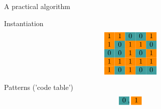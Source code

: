 \documentclass[11pt]{beamer}
\begin{document}

\begin{frame}{A practical algorithm}

\newcommand{\ca}{\cellcolor{cyan!45!yellow}}
\newcommand{\cb}{\cellcolor{red!75!blue}}
\newcommand{\cc}{\cellcolor{violet}}
\newcommand{\cd}{\cellcolor{teal!75}}
\newcommand{\ce}{\cellcolor{red!45!yellow}}

Instantiation
$$
\begin{matrix}
\ce 1 & \ce 1 & \cd 0 & \cd 0 & \ce 1  \\
\ce 1 & \cd 0 & \ce 1 & \ce 1 & \cd 0  \\
\cd 0 & \cd 0 & \ce 1 & \cd 0 & \ce 1  \\
\ce 1 & \ce 1 & \ce 1 & \ce 1 & \ce 1  \\
\ce 1 & \cd 0 & \ce 1 & \cd 0 & \cd 0  \\
\end{matrix}
$$

\small
Patterns ('code table')
$$
\begin{matrix}
\cd 0  \\
\end{matrix} \;,\enspace
\begin{matrix}
\ce 1 \\
\end{matrix}
$$ 


\end{frame}
\end{document}
